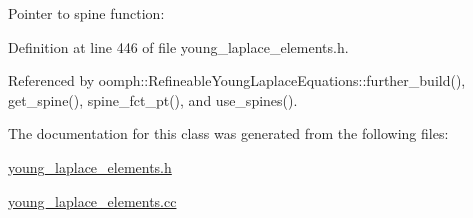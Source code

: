 Pointer to spine function\+: 



Definition at line 446 of file young\+\_\+laplace\+\_\+elements.\+h.



Referenced by oomph\+::\+Refineable\+Young\+Laplace\+Equations\+::further\+\_\+build(), get\+\_\+spine(), spine\+\_\+fct\+\_\+pt(), and use\+\_\+spines().



The documentation for this class was generated from the following files\+:\begin{DoxyCompactItemize}
\item 
\hyperlink{young__laplace__elements_8h}{young\+\_\+laplace\+\_\+elements.\+h}\item 
\hyperlink{young__laplace__elements_8cc}{young\+\_\+laplace\+\_\+elements.\+cc}\end{DoxyCompactItemize}
